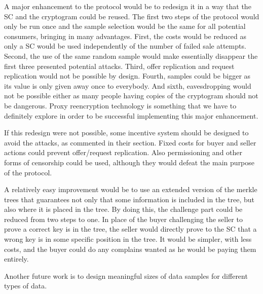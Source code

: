 \documentclass[]{article}
\begin{document}
	A major enhancement to the protocol would be to redesign it in a way that the SC and the cryptogram could be reused. The first two steps of the protocol would only be run once and the sample selection would be the same for all potential consumers, bringing in many advantages. First, the costs would be reduced as only a SC would be used independently of the number of failed sale attempts. Second, the use of the same random sample would make essentially disappear the first three presented potential attacks. Third, offer replication and request replication would not be possible by design. Fourth, samples could be bigger as its value is only given away once to everybody. And sixth, eavesdropping would not be possible either as many people having copies of the cryptogram should not be dangerous. Proxy reencryption technology is something that we have to definitely explore in order to be successful implementing this major enhancement.

	If this redesign were not possible, some incentive system should be designed to avoid the attacks, as commented in their section. Fixed costs for buyer and seller actions could prevent offer/request replication. Also permissioning and other forms of censorship could be used, although they would defeat the main purpose of the protocol.

	A relatively easy improvement would be to use an extended version of the merkle trees that guarantees not only that some information is included in the tree, but also where it is placed in the tree. By doing this, the challenge part could be reduced from two steps to one. In place of the buyer challenging the seller to prove a correct key is in the tree, the seller would directly prove to the SC that a wrong key is in some specific position in the tree. It would be simpler, with less costs, and the buyer could do any complains wanted as he would be paying them entirely.
	
	Another future work is to design meaningful sizes of data samples for different types of data.


	
	\printbibliography
	
\end{document}
